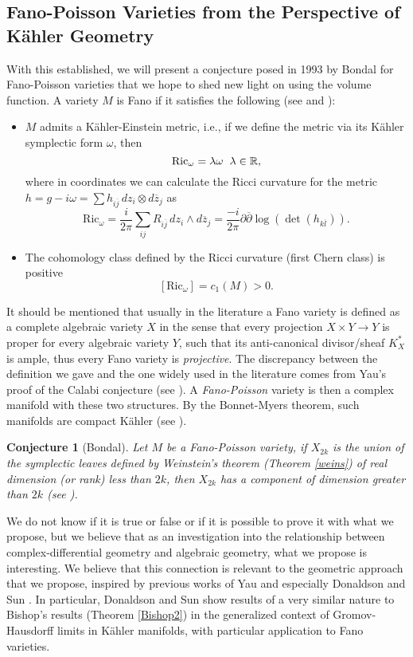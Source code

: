 \documentclass{article}
\newtheorem{conjetura}{Conjecture}
\newcommand{\re}{\ensuremath{\mathbb R }}
\begin{document}
\subsection{Fano-Poisson Varieties from the Perspective of Kähler Geometry}
\noindent With this established, we will present a conjecture posed in 1993 by Bondal for Fano-Poisson varieties that we hope to shed new light on using the volume function. A variety $M$ is Fano if it satisfies the following
(see \cite{S-Yau} and \cite{ZB}):
\begin{itemize}
        \item $M$ admits a Kähler-Einstein metric, i.e., if we define the metric via its Kähler symplectic form
        $\omega$, then
                $$\textrm{Ric}_{\omega}=\lambda\omega\hspace{0.2cm}\lambda\in\re,$$
        where in coordinates we can calculate the Ricci curvature for the metric
        \hbox{$h=g-i\omega=\sum h_{i\overline{j}}\,dz_i\otimes d\overline{z}_j$}
        as
$$\textrm{Ric}_{\omega}=\frac{i}{2\pi}\sum_{ij}R_{i\overline{j}}\,dz_i\wedge d\overline{z}_j=\frac{-i}{2\pi}\partial\overline{\partial}\log(\det(h_{k\overline{l}})).$$
        \item The cohomology class defined by the Ricci curvature (first Chern class) is positive
        $$
        [\textrm{Ric}_{\omega}]=c_1(M)>0.
        $$
\end{itemize}
\noindent It should be mentioned that usually in the literature a Fano variety is defined as a complete algebraic variety $X$
in the sense that every projection $X\times Y\rightarrow Y$ is proper for every algebraic variety $Y$, such that its anti-canonical divisor/sheaf
$K^{*}_{X}$ is ample, thus every Fano variety is \emph{projective}. The discrepancy between the definition we gave and the one widely used in
the literature comes from Yau's proof of the Calabi conjecture (see \cite{S-Yau}). A
\emph{Fano-Poisson} variety is then a complex manifold with these two structures. By the Bonnet-Myers theorem, such manifolds
are compact Kähler (see \cite{Myers}).
\begin{conjetura}[Bondal]\label{Bondal}
  Let $M$ be a Fano-Poisson variety, if $X_{2k}$ is the union of the symplectic leaves defined by Weinstein's theorem (Theorem \ref{weins})
  of real dimension (or rank) less than $2k$, then $X_{2k}$ has a component of dimension greater than $2k$ (see \cite{Bondal}).
\end{conjetura}
\noindent We do not know if it is true or false or if it is possible to prove it with what we propose, but we believe that as an
investigation into the relationship between complex-differential geometry and algebraic geometry, what we propose is interesting.
We believe that this connection is relevant to the geometric approach that we propose, inspired by previous works
of Yau \cite{S-Yau} and especially Donaldson and Sun \cite{D-SS}. In particular, Donaldson and Sun show results of a very similar nature
to Bishop's results (Theorem \ref{Bishop2}) in the generalized context of Gromov-Hausdorff limits in
Kähler manifolds, with particular application to Fano varieties.
\end{document}
